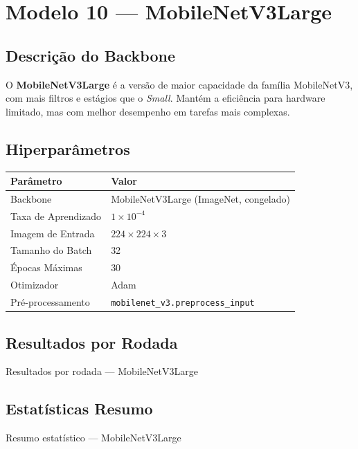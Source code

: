 \documentclass[12pt,a4paper]{article}
\newcommand{\tabelarodadas}[2]{%
  \begin{table}[H]
    \centering
    \caption{#1}
    \begin{adjustbox}{max width=\textwidth, center}
      
    \end{adjustbox}
  \end{table}%
}
\newcommand{\tabelaresumo}[2]{%
  \begin{table}[H]
    \centering
    \caption{#1}
    \begin{adjustbox}{max width=\textwidth, center}
      
    \end{adjustbox}
  \end{table}%
}
\newenvironment{parametros}{%
  \begin{table}[H]
  \centering
  \small
  \begin{tabular}{ll}
  \toprule
  \textbf{Parâmetro} & \textbf{Valor} \\
  \midrule
}{%
  \bottomrule
  \end{tabular}
  \end{table}
}
\begin{document}
\section{Modelo 10 --- MobileNetV3Large}
\label{sec:mobilenetv3large}

\subsection{Descrição do Backbone}

O \textbf{MobileNetV3Large} é a versão de maior capacidade da família MobileNetV3,
com mais filtros e estágios que o \emph{Small}. Mantém a eficiência para hardware
limitado, mas com melhor desempenho em tarefas mais complexas.

\subsection{Hiperparâmetros}

\begin{parametros}
Backbone              & MobileNetV3Large (ImageNet, congelado) \\
Taxa de Aprendizado   & $1 \times 10^{-4}$ \\
Imagem de Entrada     & $224 \times 224 \times 3$ \\
Tamanho do Batch      & 32 \\
Épocas Máximas        & 30 \\
Otimizador            & Adam \\
Pré-processamento     & \texttt{mobilenet\_v3.preprocess\_input} \\
\end{parametros}

\subsection{Resultados por Rodada}

\tabelarodadas{Resultados por rodada --- MobileNetV3Large}%
              {../results/latex/tabela_rodadas_mobilenetv3large.tex}

\subsection{Estatísticas Resumo}

\tabelaresumo{Resumo estatístico --- MobileNetV3Large}%
             {../results/latex/tabela_resumo_mobilenetv3large.tex}
\end{document}
